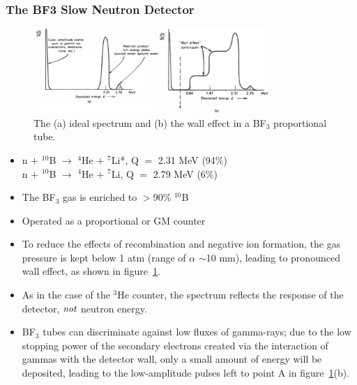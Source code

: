 \subsubsection{The BF3 Slow Neutron Detector}
\begin{figure}[ht]
    \centering
    \includegraphics[width=0.8\textwidth]{images/BF3_wall_effect.png}
    \caption{The (a) ideal spectrum and (b) the wall effect in a BF$_3$ proportional tube.}
    \label{fig:BF3_wall_effect}
\end{figure}
\begin{itemize}
    \item n $+$ $^{10}$B $\rightarrow$ $^{4}$He $+$ $^7$Li*, Q $=$ 2.31 MeV (94\%)\\
          n $+$ $^{10}$B $\rightarrow$ $^{4}$He $+$ $^7$Li, Q $=$ 2.79 MeV (6\%)
    \item The BF$_3$ gas is enriched to $>$90\% $^{10}$B
    \item Operated as a proportional or GM counter
    \item To reduce the effects of recombination and negative ion formation, the gas pressure is kept below 1 atm (range of $\alpha$ $\sim$10 mm), leading to pronounced wall effect, as shown in figure~\ref{fig:BF3_wall_effect}.
    \item As in the case of the $^3$He counter, the spectrum reflects the response of the detector, $\emph{not}$ neutron energy. 
    \item BF$_3$ tubes can discriminate against low fluxes of gamma-rays; due to the low stopping power of the secondary electrons created via the interaction of gammas with the detector wall, only a small amount of energy will be deposited, leading to the low-amplitude pulses left to point A in figure~\ref{fig:BF3_wall_effect}(b).
\end{itemize}

